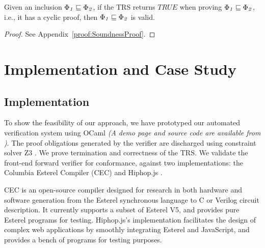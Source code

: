 \documentclass[acmsmall,10pt,review]{acmart}
\newcommand{\timedEffects}{\emph{TimEffs}}
\newcommand{\effect}{\textcolor{black}{\ensuremath{\mathrm{\Phi}}}}
\newcommand{\code}[1]{{\tt{\ensuremath{\m{#1}}}}}
\newcommand{\CONTAIN}{\sqsubseteq}
\newcommand{\m}{\mathit}
\newcommand\appref[1]{Appendix~\textcolor{blue}{\ref{#1}}}
\begin{document}
{ \begin{theorem}[Soundness]\label{Cyclicsoundness}
Given an inclusion \code{\effect_1 \CONTAIN \effect_2}, if the TRS returns \code{TRUE} when proving \code{\effect_1 \CONTAIN \effect_2}, i.e., it has a cyclic proof, 
then \code{\effect_1 \CONTAIN \effect_2} is valid.
\end{theorem}


\begin{proof}
See %
\appref{proof:SoundnessProof}.
\end{proof}






\section{Implementation and Case Study}
\label{sec:Evaluation}

\subsection{Implementation}
To show the feasibility of our approach, we have prototyped our automated verification system 
using OCaml \emph{(A demo page  and source code are available from \cite{CODE})}. 
The proof obligations generated by the verifier are discharged using constraint solver Z3 \citep{de2008z3}. 
We prove termination and correctness of the TRS. We validate the front-end forward verifier for conformance, against two implementations: the Columbia Esterel Compiler (CEC) 
\cite{CEC} and Hiphop.js \cite{HH_im}. 


CEC is an open-source compiler designed for research in both hardware and software generation from the Esterel synchronous language to C or Verilog circuit description. It currently supports a subset of Esterel V5, and provides pure Esterel programs for testing. Hiphop.js's implementation facilitates the design of complex web applications by smoothly integrating Esterel and JavaScript, and provides a bench of programs for testing purposes. 





}
\end{document}
